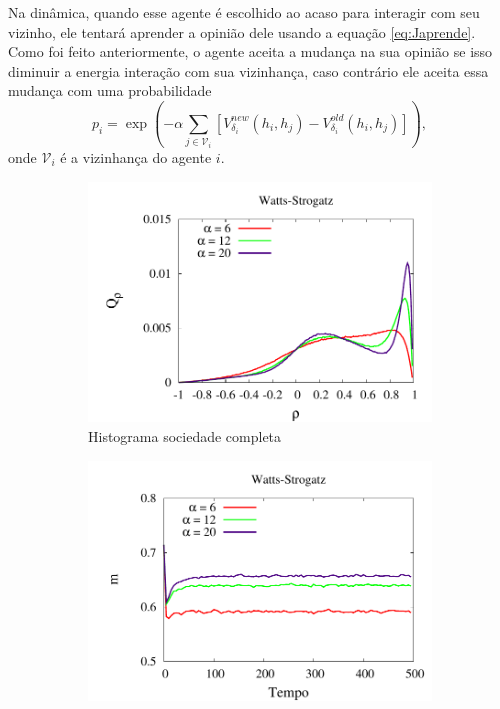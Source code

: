 Na dinâmica, quando esse agente é escolhido ao acaso para interagir
com seu vizinho, ele tentará aprender a opinião dele usando a equação
\ref{eq:Japrende}. Como foi feito anteriormente, o agente aceita a mudança
na sua opinião se isso diminuir a energia interação com sua vizinhança,
caso contrário ele aceita essa mudança com uma probabilidade
\begin{equation}
p_i = \exp\left(-\alpha\sum_{j
    \in\mathcal{V}_i} \left[V_{\delta_i}^{new}\left(h_i,h_j\right)
    -  V_{\delta_i}^{old}\left(h_i,h_j\right) \right]\right), 
\end{equation}
onde $\mathcal{V}_i$ é a vizinhança do agente $i$. 

\begin{figure}
\centering
    \begin{subfigure}[]{.9\textwidth}
        \centering
        \includegraphics[width=\textwidth]{Figures/ComparaHistoD01Beta}
        \caption{Histograma sociedade completa}
    \end{subfigure}
    \begin{subfigure}[]{.9\textwidth}
        \centering
        \includegraphics[width=\textwidth]{Figures/MagCompleto1Beta}

\end{subfigure}
\end{figure}
